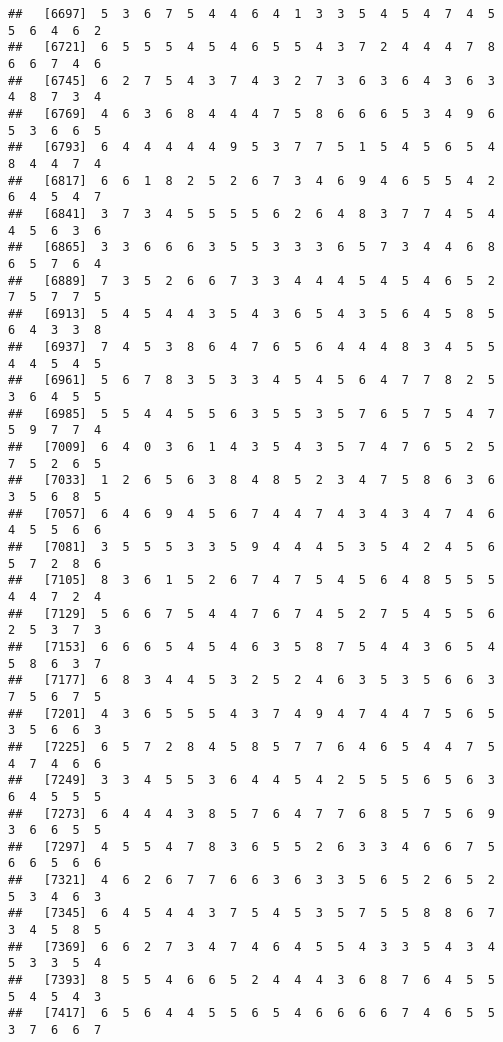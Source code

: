 \documentclass[
]{book}
\begin{document}
\begin{verbatim}
##   [6697]  5  3  6  7  5  4  4  6  4  1  3  3  5  4  5  4  7  4  5  5  6  4  6  2
##   [6721]  6  5  5  5  4  5  4  6  5  5  4  3  7  2  4  4  4  7  8  6  6  7  4  6
##   [6745]  6  2  7  5  4  3  7  4  3  2  7  3  6  3  6  4  3  6  3  4  8  7  3  4
##   [6769]  4  6  3  6  8  4  4  4  7  5  8  6  6  6  5  3  4  9  6  5  3  6  6  5
##   [6793]  6  4  4  4  4  4  9  5  3  7  7  5  1  5  4  5  6  5  4  8  4  4  7  4
##   [6817]  6  6  1  8  2  5  2  6  7  3  4  6  9  4  6  5  5  4  2  6  4  5  4  7
##   [6841]  3  7  3  4  5  5  5  5  6  2  6  4  8  3  7  7  4  5  4  4  5  6  3  6
##   [6865]  3  3  6  6  6  3  5  5  3  3  3  6  5  7  3  4  4  6  8  6  5  7  6  4
##   [6889]  7  3  5  2  6  6  7  3  3  4  4  4  5  4  5  4  6  5  2  7  5  7  7  5
##   [6913]  5  4  5  4  4  3  5  4  3  6  5  4  3  5  6  4  5  8  5  6  4  3  3  8
##   [6937]  7  4  5  3  8  6  4  7  6  5  6  4  4  4  8  3  4  5  5  4  4  5  4  5
##   [6961]  5  6  7  8  3  5  3  3  4  5  4  5  6  4  7  7  8  2  5  3  6  4  5  5
##   [6985]  5  5  4  4  5  5  6  3  5  5  3  5  7  6  5  7  5  4  7  5  9  7  7  4
##   [7009]  6  4  0  3  6  1  4  3  5  4  3  5  7  4  7  6  5  2  5  7  5  2  6  5
##   [7033]  1  2  6  5  6  3  8  4  8  5  2  3  4  7  5  8  6  3  6  3  5  6  8  5
##   [7057]  6  4  6  9  4  5  6  7  4  4  7  4  3  4  3  4  7  4  6  4  5  5  6  6
##   [7081]  3  5  5  5  3  3  5  9  4  4  4  5  3  5  4  2  4  5  6  5  7  2  8  6
##   [7105]  8  3  6  1  5  2  6  7  4  7  5  4  5  6  4  8  5  5  5  4  4  7  2  4
##   [7129]  5  6  6  7  5  4  4  7  6  7  4  5  2  7  5  4  5  5  6  2  5  3  7  3
##   [7153]  6  6  6  5  4  5  4  6  3  5  8  7  5  4  4  3  6  5  4  5  8  6  3  7
##   [7177]  6  8  3  4  4  5  3  2  5  2  4  6  3  5  3  5  6  6  3  7  5  6  7  5
##   [7201]  4  3  6  5  5  5  4  3  7  4  9  4  7  4  4  7  5  6  5  3  5  6  6  3
##   [7225]  6  5  7  2  8  4  5  8  5  7  7  6  4  6  5  4  4  7  5  4  7  4  6  6
##   [7249]  3  3  4  5  5  3  6  4  4  5  4  2  5  5  5  6  5  6  3  6  4  5  5  5
##   [7273]  6  4  4  4  3  8  5  7  6  4  7  7  6  8  5  7  5  6  9  3  6  6  5  5
##   [7297]  4  5  5  4  7  8  3  6  5  5  2  6  3  3  4  6  6  7  5  6  6  5  6  6
##   [7321]  4  6  2  6  7  7  6  6  3  6  3  3  5  6  5  2  6  5  2  5  3  4  6  3
##   [7345]  6  4  5  4  4  3  7  5  4  5  3  5  7  5  5  8  8  6  7  3  4  5  8  5
##   [7369]  6  6  2  7  3  4  7  4  6  4  5  5  4  3  3  5  4  3  4  5  3  3  5  4
##   [7393]  8  5  5  4  6  6  5  2  4  4  4  3  6  8  7  6  4  5  5  5  4  5  4  3
##   [7417]  6  5  6  4  4  5  5  6  5  4  6  6  6  6  7  4  6  5  5  3  7  6  6  7

\end{verbatim}
\end{document}

